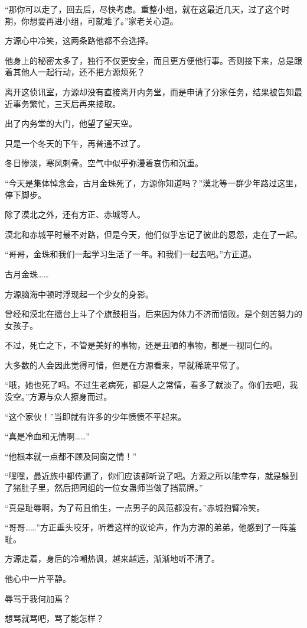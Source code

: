 \begin{this_body}
“那你可以走了，回去后，尽快考虑。重整小组，就在这最近几天，过了这个时期，你想要再进小组，可就难了。”家老关心道。

方源心中冷笑，这两条路他都不会选择。

他身上的秘密太多了，独行不仅更安全，而且更方便他行事。否则接下来，总是跟着其他人一起行动，还不把方源烦死？

离开这侦讯室，方源却没有直接离开内务堂，而是申请了分家任务，结果被告知最近事务繁忙，三天后再来接取。

出了内务堂的大门，他望了望天空。

只是一个冬天的下午，再普通不过了。

冬日惨淡，寒风刺骨。空气中似乎弥漫着哀伤和沉重。

“今天是集体悼念会，古月金珠死了，方源你知道吗？”漠北等一群少年路过这里，停下脚步。

除了漠北之外，还有方正、赤城等人。

漠北和赤城平时最不对路，但是今天，他们似乎忘记了彼此的恩怨，走在了一起。

“哥哥，金珠和我们一起学习生活了一年。和我们一起去吧。”方正道。

古月金珠……

方源脑海中顿时浮现起一个少女的身影。

曾经和漠北在擂台上斗了个旗鼓相当，后来因为体力不济而惜败。是个刻苦努力的女孩子。

不过，死亡之下，不管是美好的事物，还是丑陋的事物，都是一视同仁的。

大多数的人会因此觉得可惜，但是在方源看来，早就稀疏平常了。

“哦，她也死了吗。不过生老病死，都是人之常情，看多了就淡了。你们去吧，我没空。”方源与众人擦身而过。

“这个家伙！”当即就有许多的少年愤愤不平起来。

“真是冷血和无情啊……”

“他根本就一点都不顾及同窗之情！”

“嘿嘿，最近族中都传遍了，你们应该都听说了吧。方源之所以能幸存，就是躲到了猪肚子里，然后把同组的一位女蛊师当做了挡箭牌。”

“真是耻辱啊，为了苟且偷生，一点男子的风范都没有。”赤城抱臂冷笑。

“哥哥……”方正垂头咬牙，听着这样的议论声，作为方源的弟弟，他感到了一阵羞耻。

方源走着，身后的冷嘲热讽，越来越远，渐渐地听不清了。

他心中一片平静。

辱骂于我何加焉？

想骂就骂吧，骂了能怎样？


\end{this_body}
